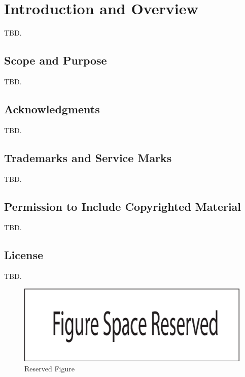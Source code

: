\section{Introduction and Overview}
\label{siov0}

TBD.


\subsection{Scope and Purpose}
\label{siov0:sspu0}

TBD.


\subsection{Acknowledgments}
\label{siov0:sack0}

TBD.


\subsection{Trademarks and Service Marks}
\label{siov0:stsm0}

TBD.


\subsection{Permission to Include Copyrighted Material}
\label{siov0:spcr0}

TBD.


\subsection{License}
\label{siov0:slic0}

TBD.


\begin{figure}
\centering
\includegraphics[width=4.6in]{common/figure_reserved.eps}
\caption{Reserved Figure}
\label{fig:siov0:01}
\end{figure}

